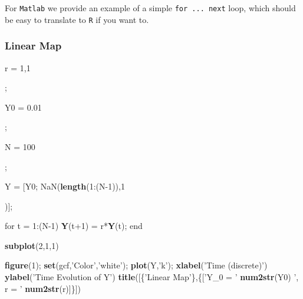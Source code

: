\documentclass[]{book}
\newenvironment{Shaded}{\begin{snugshade}}{\end{snugshade}}
\newcommand{\KeywordTok}[1]{\textcolor[rgb]{0.13,0.29,0.53}{\textbf{{#1}}}}
\newcommand{\DecValTok}[1]{\textcolor[rgb]{0.00,0.00,0.81}{{#1}}}
\newcommand{\FloatTok}[1]{\textcolor[rgb]{0.00,0.00,0.81}{{#1}}}
\newcommand{\StringTok}[1]{\textcolor[rgb]{0.31,0.60,0.02}{{#1}}}
\newcommand{\OtherTok}[1]{\textcolor[rgb]{0.56,0.35,0.01}{{#1}}}
\newcommand{\NormalTok}[1]{{#1}}
\begin{document}
For \texttt{Matlab} we provide an example of a simple
\texttt{for\ ...\ next} loop, which should be easy to translate to
\texttt{R} if you want to.

\subsubsection*{Linear Map}\label{linear-map}

\begin{Shaded}
\begin{Highlighting}[]
\NormalTok{%

\NormalTok{%

\NormalTok{r  =}\StringTok{ }\DecValTok{1}\NormalTok{,}\DecValTok{1}\NormalTok{;       %

\NormalTok{Y0 =}\StringTok{ }\FloatTok{0.01}\NormalTok{;   %

\NormalTok{N  =}\StringTok{ }\DecValTok{100}\NormalTok{;     %

\NormalTok{%
\NormalTok{Y =}\StringTok{ }\NormalTok{[Y0; }\OtherTok{NaN}\NormalTok{(}\KeywordTok{length}\NormalTok{(}\DecValTok{1}\NormalTok{:(N}\DecValTok{-1}\NormalTok{)),}\DecValTok{1}\NormalTok{)];   %

\NormalTok{%
\NormalTok{for t =}\StringTok{ }\DecValTok{1}\NormalTok{:(N}\DecValTok{-1}\NormalTok{)}
 \KeywordTok{Y}\NormalTok{(t}\DecValTok{+1}\NormalTok{) =}\StringTok{ }\NormalTok{r*}\KeywordTok{Y}\NormalTok{(t);  }
\NormalTok{end}

\NormalTok{%

\KeywordTok{subplot}\NormalTok{(}\DecValTok{2}\NormalTok{,}\DecValTok{1}\NormalTok{,}\DecValTok{1}\NormalTok{)}
\NormalTok{%
\KeywordTok{figure}\NormalTok{(}\DecValTok{1}\NormalTok{);}
\KeywordTok{set}\NormalTok{(gcf,}\StringTok{'Color'}\NormalTok{,}\StringTok{'white'}\NormalTok{);}
\KeywordTok{plot}\NormalTok{(Y,}\StringTok{'k'}\NormalTok{);}
\KeywordTok{xlabel}\NormalTok{(}\StringTok{'Time (discrete)'}\NormalTok{)}
\KeywordTok{ylabel}\NormalTok{(}\StringTok{'Time Evolution of Y'}\NormalTok{)}
\KeywordTok{title}\NormalTok{([\{}\StringTok{'Linear Map'}\NormalTok{\},\{[}\StringTok{'Y_0 = '} \KeywordTok{num2str}\NormalTok{(Y0) }\StringTok{', r = '} \KeywordTok{num2str}\NormalTok{(r)]\}])}

}}}}}}}}}}
\end{Highlighting}
\end{Shaded}
\end{document}
